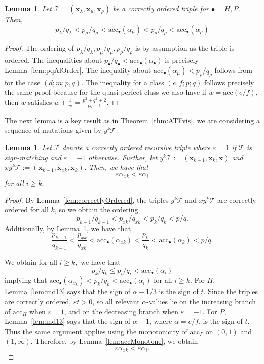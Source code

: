\documentclass[11pt, reqno]{amsart}
\newtheorem{lemma}[thm]{Lemma}
\theoremstyle{remark}
\numberwithin{equation}{subsection}
\numberwithin{figure}{section}
\theoremstyle{customremark}
\newcommand{\Tt}{\mathcal{T}}
\newcommand{\al}{{\alpha}}
\newcommand{\la}{{\lambda}}
\newcommand{\eps}{\varepsilon}
\newcommand{\acc}{\mathrm{acc}}
\begin{document}
\begin{lemma} \label{lem:pqAlOrder2}
    Let $\Tt=(\bm{x}_\la,\bm{x}_\mu,\bm{x}_\rho)$ be a correctly ordered triple for $\bullet=H,P$. Then, 
    \[ p_\la/q_\la<p_\mu/q_\mu<\acc_\bullet(\al_\mu)<p_\rho/q_\rho<\acc_\bullet(\al_\rho)\]
\end{lemma}
\begin{proof}
    The ordering of $p_\la/q_\la,p_\mu/q_\mu,p_\rho/q_\rho$ is by assumption as the triple is ordered. The inequalities about $p_\bullet/q_\bullet<\acc_\bullet(\al_\bullet)$ is precisely Lemma~\ref{lem:pqAlOrder}. The inequality about $\acc_\bullet(\al_\mu)<p_\rho/q_\rho$ follows from \cite[Lemma 2.1.10]{MMW} for the case $(d;m;p,q)$. 
    The inequality for a class $(e,f;p;q)$ follows precisely the same proof because for the quasi-perfect class we also have if $w=\acc(e/f)$, then $w$ satisfies $w+\frac{1}{w}=\frac{p^2+q^2+2}{pq-1}.$
\end{proof}

The next lemma is a key result as in Theorem~\ref{thm:ATFvis}, we are considering a sequence of mutations given by $y^k\Tt.$ 

\begin{lemma} \label{lem:moreAlOrder}
Let $\Tt$ denote a correctly ordered recursive triple where $\eps=1$ if $\Tt$ is sign-matching and $\eps=-1$ otherwise. 
Further, let $y^k\Tt:=(\bm{x}_{k-1},\bm{x}_k,\bm{x})$ and $xy^k\Tt:=(\bm{x}_{k-1},\bm{x}_{xk},\bm{x}_k)$. Then, we have that 
   \[ \eps\al_{xk} <\eps\al_i\]
   for all $i \geq k.$
\end{lemma}
\begin{proof}
By Lemma~\ref{lem:correctlyOrdered}, the triples $y^k\Tt$ and $xy^k\Tt$ are correctly ordered for all $k$, so we obtain the ordering
\[ p_{k-1}/q_{k-1}<p_{xk}/q_{xk}<p_k/q_k<p/q.\]
Additionally, by Lemma~\ref{lem:pqAlOrder2}, we have that
    \[ \frac{p_{k-1}}{q_{k-1}} < \frac{p_{xk}}{q_{xk}}<\acc_\bullet(\al_{xk}) <\frac{p_k}{q_k} <\acc_\bullet(\al_k) <p/q.\]

We obtain for all $i \geq k,$ we have that 
\[ p_k/q_k \leq p_i/q_i < \acc_\bullet(\al_i)\]
implying that $\acc_\bullet(\al_{x_k}) < p_k/q_k<\acc_\bullet(\al_i)$ for all $i \geq k.$
For \(H\), Lemma~\ref{lem:md13} says that the sign of
\(\alpha-1/3\) is the sign of \(t\). Since the triples are correctly
ordered, \(\eps t>0\), so all relevant \(\alpha\)-values lie on the
increasing branch of \(\acc_H\) when \(\eps=1\), and on the decreasing
branch when \(\eps=-1\). For \(P\), Lemma~\ref{lem:md13} says that the sign of \(\alpha-1\), where
\(\alpha=e/f\), is the sign of \(t\). Thus the same argument applies using
the monotonicity of \(\acc_P\) on \((0,1)\) and \((1,\infty)\).
Therefore, by Lemma~\ref{lem:accMonotone}, we obtain
\[
\eps\alpha_{xk}<\eps\alpha_i.
\]



\end{proof}
\end{document}
